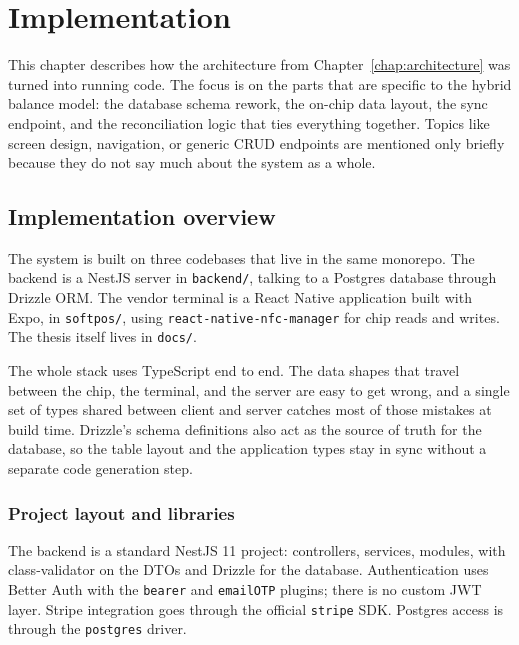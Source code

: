 \chapter{Implementation}
\label{chap:implementation}

This chapter describes how the architecture from Chapter~\ref{chap:architecture} was turned into running code. The focus is on the parts that are specific to the hybrid balance model: the database schema rework, the on-chip data layout, the sync endpoint, and the reconciliation logic that ties everything together. Topics like screen design, navigation, or generic CRUD endpoints are mentioned only briefly because they do not say much about the system as a whole.

\section{Implementation overview}
\label{sec:impl-overview}

The system is built on three codebases that live in the same monorepo. The backend is a NestJS server in \texttt{backend/}, talking to a Postgres database through Drizzle ORM. The vendor terminal is a React Native application built with Expo, in \texttt{softpos/}, using \texttt{react-native-nfc-manager} for chip reads and writes. The thesis itself lives in \texttt{docs/}.

The whole stack uses TypeScript end to end. The data shapes that travel between the chip, the terminal, and the server are easy to get wrong, and a single set of types shared between client and server catches most of those mistakes at build time. Drizzle's schema definitions also act as the source of truth for the database, so the table layout and the application types stay in sync without a separate code generation step.

\subsection{Project layout and libraries}
\label{subsec:impl-libraries}

The backend is a standard NestJS 11 project: controllers, services, modules, with class-validator on the DTOs and Drizzle for the database. Authentication uses Better Auth with the \texttt{bearer} and \texttt{emailOTP} plugins; there is no custom JWT layer. Stripe integration goes through the official \texttt{stripe} SDK. Postgres access is through the \texttt{postgres} driver.

